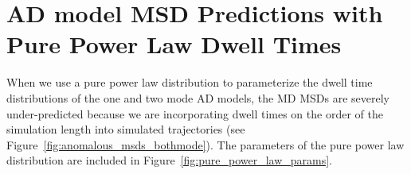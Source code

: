 \documentclass{article}
\begin{document}
\begin{figure}[htb!]
{%
  }\label{fig:anticorrelated_hops}
  \end{figure}
  
  \newpage
  
  \section{AD model MSD Predictions with Pure Power Law Dwell Times}\label{section:pure_power_law}
  
  When we use a pure power law distribution to parameterize the dwell time 
  distributions of the one and two mode AD models, the MD MSDs are severely 
  under-predicted because we are incorporating dwell times on the order of 
  the simulation length into simulated trajectories 
  (see Figure~\ref{fig:anomalous_msds_bothmode}). The parameters of the pure power law 
   distribution are included in Figure~\ref{fig:pure_power_law_params}. 
  
\end{document}
